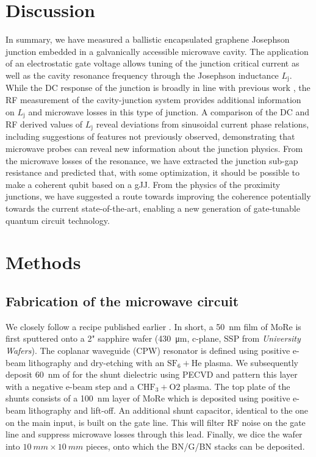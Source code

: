 \section{Discussion}

In summary, we have measured a ballistic encapsulated graphene Josephson junction embedded in a galvanically accessible microwave cavity.
The application of an electrostatic gate voltage allows tuning of the junction critical current as well as the cavity resonance frequency through the Josephson inductance $L_\text{j}$.
While the DC response of the junction is broadly in line with previous work \cite{calado_ballistic_2015a,benshalom_quantum_2015,lee_ultimately_2015}, the RF measurement of the cavity-junction system provides additional information on $L_\text{j}$ and microwave losses in this type of junction.
A comparison of the DC and RF derived values of $L_\text{j}$ reveal deviations from sinusoidal current phase relations, including suggestions of features not previously observed, demonstrating that microwave probes can reveal new information about the junction physics. 
From the microwave losses of the resonance, we have extracted the junction sub-gap resistance and predicted that, with some optimization, it should be possible to make a coherent qubit based on a gJJ.
From the physics of the proximity junctions, we have suggested a route towards improving the coherence potentially towards the current state-of-the-art, enabling a new generation of gate-tunable quantum circuit technology. 


\section*{Methods}
\subsection*{Fabrication of the microwave circuit}
We closely follow a recipe published earlier \cite{bosman_broadband_2015,singh_molybdenumrhenium_2014}.
In short, a \SI{50}{nm} film of MoRe is first sputtered onto a 2" sapphire wafer (\SI{430}{\micro m}, c-plane, SSP from \textit{University Wafers}).
The coplanar waveguide (CPW) resonator is defined using positive e-beam lithography and dry-etching with an $\mathrm{SF_6 + He}$ plasma.
We subsequently deposit \SI{60}{nm} of  for the shunt dielectric using PECVD and pattern this layer with a negative e-beam step and a $\mathrm{CHF_3 + O2}$ plasma.
The top plate of the shunts consists of a \SI{100}{nm} layer of MoRe which is deposited using positive e-beam lithography and lift-off.
An additional shunt capacitor, identical to the one on the main input, is built on the gate line.
This will filter RF noise on the gate line and suppress microwave losses through this lead.
Finally, we dice the wafer into $\SI{10}{mm}\times\SI{10}{mm}$ pieces, onto which the BN/G/BN stacks can be deposited.


